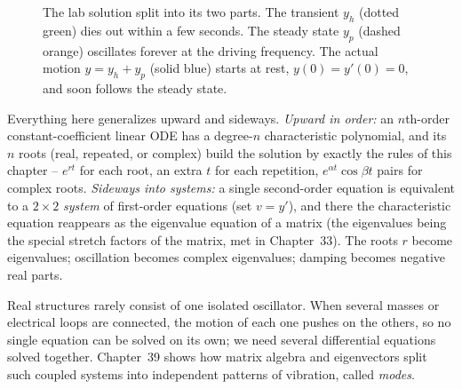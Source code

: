 \begin{figure}[htbp]
\centering
{}
\caption{The lab solution split into its two parts. The transient $y_h$ (dotted
green) dies out within a few seconds. The steady state $y_p$ (dashed orange)
oscillates forever at the driving frequency. The actual motion $y = y_h + y_p$
(solid blue) starts at rest, $y(0) = y'(0) = 0$, and soon follows the steady
state.}
\label{ch38:fig-lab-decomposition}
\end{figure}

\begin{connectionbox}
Everything here generalizes upward and sideways. \emph{Upward in order:} an
$n$th-order constant-coefficient linear ODE has a degree-$n$ characteristic
polynomial, and its $n$ roots (real, repeated, or complex) build the solution by
exactly the rules of this chapter -- $e^{rt}$ for each root, an extra $t$ for each
repetition, $e^{\alpha t}\cos\beta t$ pairs for complex roots. \emph{Sideways into
systems:} a single second-order equation is equivalent to a $2\times 2$
\emph{system} of first-order equations (set $v = y'$), and there the
characteristic equation reappears as the eigenvalue equation of a matrix (the
eigenvalues being the special stretch factors of the matrix, met in Chapter~33).
The roots $r$ become eigenvalues; oscillation becomes complex eigenvalues; damping
becomes negative real parts.

Real structures rarely consist of one isolated
oscillator. When several masses or electrical loops are connected, the motion of
each one pushes on the others, so no single equation can be solved on its own; we
need several differential equations solved together. Chapter~39 shows how matrix
algebra and eigenvectors split such coupled systems into independent
patterns of vibration, called \emph{modes}.
\end{connectionbox}

